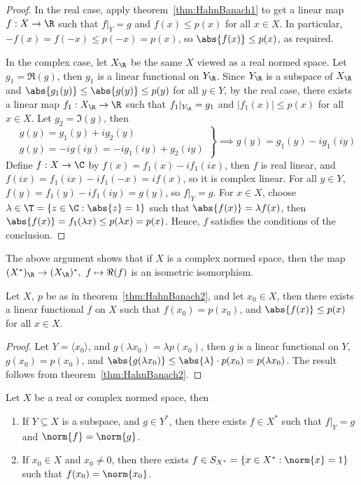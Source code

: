 \documentclass[a4paper]{article}
\begin{document}
\begin{proof}
  In the real case, apply theorem~\ref{thm:HahnBanach1} to get a linear map $f:X\to\R$ such that $f|_Y=g$ and $f(x)\leq p(x)$ for all $x\in X$. In particular, $-f(x)=f(-x)\leq p(-x)=p(x)$, so $\abs{f(x)}\leq p(x)$, as required.

  In the complex case, let $X_{\R}$ be the same $X$ viewed as a real normed space. Let $g_1=\Re(g)$, then $g_1$ is a linear functional on $Y_\R$. Since $Y_\R$ is a subspace of $X_\R$ and $\abs{g_1(y)}\leq\abs{g(y)}\leq p(y)$ for all $y\in Y$, by the real case, there exists a linear map $f_1:X_\R\to\R$ such that $f_1|_{Y_\R}=g_1$ and $|f_1(x)|\leq p(x)$ for all $x\in X$. Let $g_2=\Im(g)$, then
  \[
    \left.\begin{aligned}
    & g(y)=g_1(y)+ig_2(y)\\
    & g(y)=-ig(iy)=-ig_1(iy)+g_2(iy)
    \end{aligned}\right\}
    \implies g(y)=g_1(y)-ig_1(iy)
  \]
  Define $f:X\to\C$ by $f(x)=f_1(x)-if_1(ix)$, then $f$ is real linear, and $f(ix)=f_1(ix)-if_1(-x)=if(x)$, so it is complex linear. For all $y\in Y$, $f(y)=f_1(y)-if_1(iy)=g(y)$, so $f|_Y=g$. For $x\in X$, choose $\lambda\in\T=\{z\in\C:\abs{z}=1\}$ such that $\abs{f(x)}=\lambda f(x)$, then $\abs{f(x)}=f_1(\lambda x)\leq p(\lambda x)=p(x)$. Hence, $f$ satisfies the conditions of the conclusion.
\end{proof}

\begin{remark}
  The above argument shows that if $X$ is a complex normed space, then the map $(X^*)_\R\to(X_\R)^*,\ f\mapsto\Re(f)$ is an isometric isomorphism.
\end{remark}

\begin{ncor}\label{cor:NormingFunctional}
  Let $X,\ p$ be as in theorem~\ref{thm:HahnBanach2}, and let $x_0\in X$, then there exists a linear functional $f$ on $X$ such that $f(x_0)=p(x_0)$, and $\abs{f(x)}\leq p(x)$ for all $x\in X$.
\end{ncor}

\begin{proof}
  Let $Y=\langle x_0\rangle$, and $g(\lambda x_0)=\lambda p(x_0)$, then $g$ is a linear functional on $Y$, $g(x_0)=p(x_0)$, and $\abs{g(\lambda x_0)}\leq\abs{\lambda}\cdot p(x_0)=p(\lambda x_0)$. The result follows from theorem~\ref{thm:HahnBanach2}.
\end{proof}

\begin{nthm}\label{thm:HahnBanach3}
  Let $X$ be a real or complex normed space, then
  \begin{enumerate}[label=(\roman*),nosep]
    \item If $Y\subseteq X$ is a subspace, and $g\in Y^*$, then there exists $f\in X^*$ such that $f|_Y=g$ and $\norm{f}=\norm{g}$.
    \item If $x_0\in X$ and $x_0\not= 0$, then there exists $f\in S_{X^*}=\{x\in X^*:\norm{x}=1\}$ such that $f(x_0)=\norm{x_0}$.
  \end{enumerate}
\end{nthm}
\end{document}
